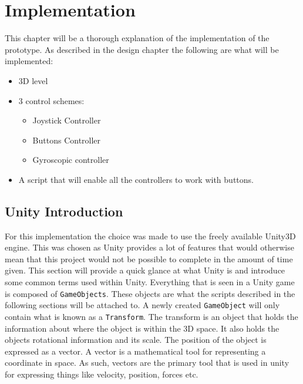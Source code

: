 \chapter{Implementation}
This chapter will be a thorough explanation of the implementation of the prototype.
As described in the design chapter the following are what will be implemented:
\begin{itemize}
\item 3D level
\item 3 control schemes:
		\begin{itemize}
		\item Joystick Controller
		\item Buttons Controller
		\item Gyroscopic controller 
		\end{itemize}
\item A script that will enable all the controllers to work with buttons.
\end{itemize}

\section{Unity Introduction}
For this implementation the choice was made to use the freely available Unity3D engine. This was chosen as Unity provides a lot of features that would otherwise mean that this project would not be possible to complete in the amount of time given. This section will provide a quick glance at what Unity is and introduce some common terms used within Unity. Everything that is seen in a Unity game is composed of {\tt GameObjects}. These objects are what the scripts described in the following sections will be attached to. A newly created {\tt GameObject} will only contain what is known as a {\tt Transform}. The transform is an object that holds the information about where the object is within the 3D space. It also holds the objects rotational information  and its scale.
The position of the object is expressed as a vector. A vector is a mathematical tool for representing a coordinate in space. As such, vectors are the primary tool that is used in unity for expressing things like velocity, position, forces etc.
